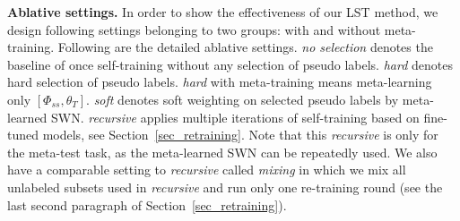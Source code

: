 \documentclass{article}
\newcommand{\myparagraph}[1]{\vspace{0.1em}\noindent\textbf{#1}}
\begin{document}
\myparagraph{Ablative settings.}
In order to show the effectiveness of our LST method, we design following settings belonging to two groups: with and without meta-training.
Following are the detailed ablative settings.
\emph{no selection} denotes the baseline of once self-training without any selection of pseudo labels.
\emph{hard} denotes hard selection of pseudo labels. \emph{hard} with meta-training means meta-learning only $[\Phi_{ss}, \theta_{T}]$.
\emph{soft} denotes soft weighting on selected pseudo labels by meta-learned SWN. 
\emph{recursive} applies multiple iterations of self-training based on fine-tuned models, see Section~\ref{sec_retraining}. Note that this \emph{recursive} is only for the meta-test task, as the meta-learned SWN can be repeatedly used.
We also have a comparable setting to \emph{recursive} called \emph{mixing} in which we mix all unlabeled subsets used in \emph{recursive} and run only one re-training round (see the last second paragraph of Section~\ref{sec_retraining}).
\end{document}
